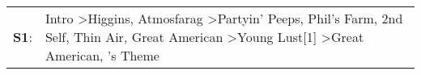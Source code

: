 \begin{supertabular}{p{0.03\textwidth}p{0.92\textwidth}}
 \textbf{S1}:  &  Intro\textsuperscript{} \textgreater \enspace Higgins\textsuperscript{}, \enspace Atmosfarag\textsuperscript{} \textgreater \enspace Partyin' Peeps\textsuperscript{}, \enspace Phil's Farm\textsuperscript{}, \enspace 2nd Self\textsuperscript{}, \enspace Thin Air\textsuperscript{}, \enspace Great American\textsuperscript{} \textgreater \enspace Young Lust[1]\textsuperscript{} \textgreater \enspace Great American\textsuperscript{}, 's Theme\textsuperscript{}  \enspace  \\
\end{supertabular}
